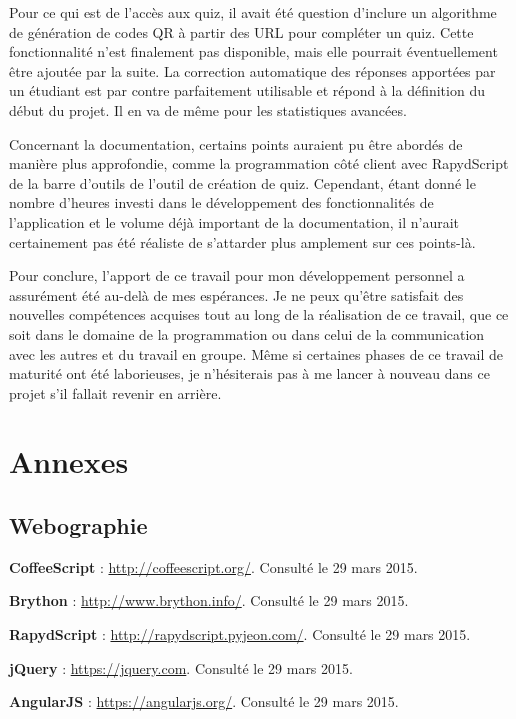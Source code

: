 \documentclass[a4paper,11pt,openany,oneside]{sphinxmanual}
\begin{document}
Pour ce qui est de l'accès aux quiz, il avait été question d'inclure un algorithme
de génération de codes QR à partir des URL pour compléter un quiz. Cette fonctionnalité
n'est finalement pas disponible, mais elle pourrait éventuellement être ajoutée par la suite.
La correction automatique des réponses apportées par un étudiant est par contre
parfaitement utilisable et répond à la définition du début du projet. Il en va de même
pour les statistiques avancées.

Concernant la documentation, certains points auraient pu être abordés de manière
plus approfondie, comme la programmation côté client avec RapydScript de la barre
d'outils de l'outil de création de quiz. Cependant, étant donné le nombre d'heures
investi dans le développement des fonctionnalités de l'application et le volume
déjà important de la documentation, il n'aurait certainement pas été réaliste de
s'attarder plus amplement sur ces points-là.

Pour conclure, l'apport de ce travail pour mon développement personnel a assurément
été au-delà de mes espérances. Je ne peux qu'être satisfait des nouvelles compétences acquises
tout au long de la réalisation de ce travail, que ce soit dans le domaine de la programmation
ou dans celui de la communication avec les autres et du travail en groupe. Même si certaines
phases de ce travail de maturité ont été laborieuses, je n'hésiterais pas à me lancer
à nouveau dans ce projet s'il fallait revenir en arrière.


\chapter{Annexes}
\label{end:annexes}\label{end::doc}

\section{Webographie}
\label{end:webographie}
\textbf{CoffeeScript} : \href{http://coffeescript.org/}{http://coffeescript.org/}. Consulté le 29 mars 2015.

\textbf{Brython} : \href{http://www.brython.info/}{http://www.brython.info/}. Consulté le 29 mars 2015.

\textbf{RapydScript} : \href{http://rapydscript.pyjeon.com/}{http://rapydscript.pyjeon.com/}. Consulté le 29 mars 2015.

\textbf{jQuery} : \href{https://jquery.com}{https://jquery.com}. Consulté le 29 mars 2015.

\textbf{AngularJS} : \href{https://angularjs.org/}{https://angularjs.org/}. Consulté le 29 mars 2015.
\end{document}
